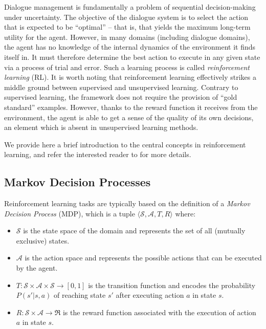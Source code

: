 Dialogue management is fundamentally a problem of sequential decision-making under uncertainty. The objective of the dialogue system is to select the action that is expected to be ``optimal'' -- that is, that yields the maximum long-term utility for the agent. However, in many domains (including dialogue domains), the agent has no knowledge of the internal dynamics of the environment it finds itself in.  It must therefore determine the best action to execute in any given state via a process of trial and error.  Such a learning process is called \textit{reinforcement learning} (RL).  It is worth noting that reinforcement learning effectively strikes a middle ground between supervised and unsupervised learning.  Contrary to supervised learning, the framework does not require the provision of ``gold standard'' examples.  However,  thanks to the reward function it receives from the environment, the agent is able to get a sense of the quality of its own decisions, an element which is absent in unsupervised learning methods.  

We provide here a brief introduction to the central concepts in reinforcement learning, and refer the interested reader to \cite{citeulike:112017} for more details. 

\subsection{Markov Decision Processes}
\label{sec:mdp}

Reinforcement learning tasks are typically based on the definition of a \textit{Markov Decision Process} (MDP), which is a tuple $\langle \mathcal{S}, \mathcal{A}, T, R \rangle$ where:
\begin{itemize}
\item $\mathcal{S}$ is the state space of the domain and represents the set of all (mutually exclusive) states.
\item $\mathcal{A}$ is the action space and represents the possible actions that can be executed by the agent.
\item $T: \mathcal{S} \times \mathcal{A} \times \mathcal{S} \rightarrow [0,1]$ is the transition function and encodes the probability $P(s'|s,a)$ of reaching state $s'$ after executing action $a$ in state $s$.
\item $R:  \mathcal{S} \times \mathcal{A} \rightarrow \Re$ is the reward function associated with the execution of action $a$ in state $s$.
\end{itemize}
 
